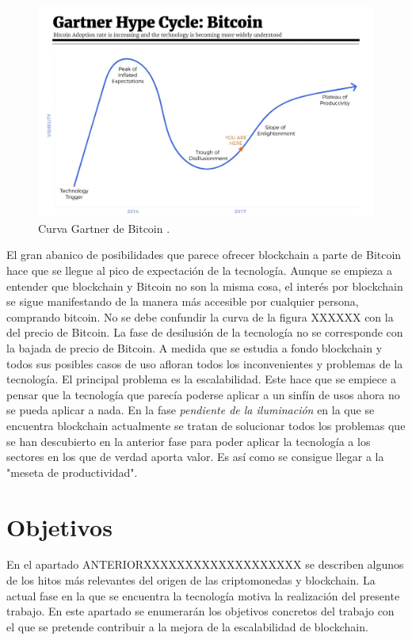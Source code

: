 \begin{figure}
	\centering
	\includegraphics[width=1\textwidth]{imagenes/hypercycle.jpg}
	\caption{\label{fig1}Curva Gartner de Bitcoin \cite{gartner}.}
\end{figure}

El gran abanico de posibilidades que parece ofrecer blockchain a parte de Bitcoin hace que se llegue al pico de expectación de la tecnología. Aunque se empieza a entender que blockchain y Bitcoin no son la misma cosa, el interés por blockchain se sigue manifestando de la manera más accesible por cualquier persona, comprando bitcoin. No se debe confundir la curva de la figura XXXXXX con la del precio de Bitcoin. La fase de desilusión de la tecnología no se corresponde con la bajada de precio de Bitcoin. A medida que se estudia a fondo blockchain y todos sus posibles casos de uso afloran todos los inconvenientes y problemas de la tecnología. El principal problema es la escalabilidad. Este hace que se empiece a pensar que la tecnología que parecía poderse aplicar a un sinfín de usos ahora no se pueda aplicar a nada. En la fase \textit{pendiente de la iluminación} en la que se encuentra blockchain actualmente se tratan de solucionar todos los problemas que se han descubierto en la anterior fase para poder aplicar la tecnología a los sectores en los que de verdad aporta valor. Es así como se consigue llegar a la "meseta de productividad".  





\section{Objetivos}

En el apartado ANTERIORXXXXXXXXXXXXXXXXXXX se describen algunos de los hitos más relevantes del origen de las criptomonedas y blockchain. La actual fase en la que se encuentra la tecnología motiva la realización del presente trabajo. En este apartado se enumerarán los objetivos concretos del trabajo con el que se pretende contribuir a la mejora de la escalabilidad de blockchain. \newline

